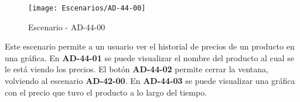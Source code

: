 \begin{figure}[H]
\centering
\texttt{[image: Escenarios/AD-44-00]}
\caption{Escenario - AD-44-00}
\label{fig:AD-44-00}
\end{figure}

Este escenario permite a un usuario ver el historial de precios de un producto en una gráfica. En \textbf{AD-44-01} se puede visualizar el nombre del producto al cual se le está viendo los precios. El botón \textbf{AD-44-02} permite cerrar la ventana, volviendo al escenario \textbf{AD-42-00}. En \textbf{AD-44-03} se puede visualizar una gráfica con el precio que tuvo el producto a lo largo del tiempo.
\\